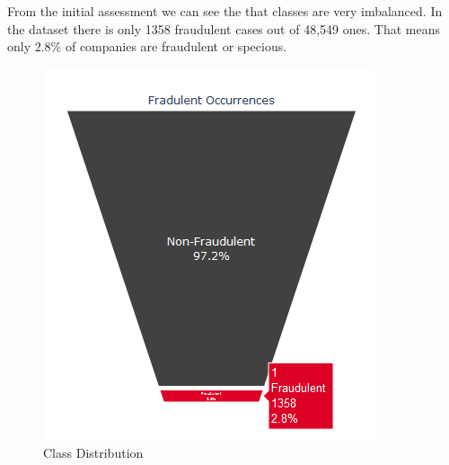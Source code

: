 From the initial assessment we can see the that classes are very imbalanced. In the dataset there is only 1358 fraudulent cases out of 48,549 ones. That means only 2.8\% of companies are fraudulent or specious. 

\begin{figure}[H]
    \centering
    \includegraphics[width=.8\linewidth]{figures/class_imbalance.png}
    \caption{Class Distribution}
    \label{fig:class distribution}
\end{figure}

